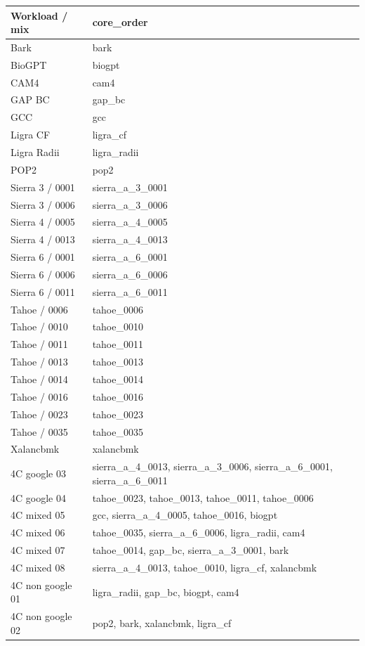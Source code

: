\begin{tabular}{ll}
\toprule
Workload / mix & core\_order \\
\midrule
Bark & bark \\
BioGPT & biogpt \\
CAM4 & cam4 \\
GAP BC & gap\_bc \\
GCC & gcc \\
Ligra CF & ligra\_cf \\
Ligra Radii & ligra\_radii \\
POP2 & pop2 \\
Sierra 3 / 0001 & sierra\_a\_3\_0001 \\
Sierra 3 / 0006 & sierra\_a\_3\_0006 \\
Sierra 4 / 0005 & sierra\_a\_4\_0005 \\
Sierra 4 / 0013 & sierra\_a\_4\_0013 \\
Sierra 6 / 0001 & sierra\_a\_6\_0001 \\
Sierra 6 / 0006 & sierra\_a\_6\_0006 \\
Sierra 6 / 0011 & sierra\_a\_6\_0011 \\
Tahoe / 0006 & tahoe\_0006 \\
Tahoe / 0010 & tahoe\_0010 \\
Tahoe / 0011 & tahoe\_0011 \\
Tahoe / 0013 & tahoe\_0013 \\
Tahoe / 0014 & tahoe\_0014 \\
Tahoe / 0016 & tahoe\_0016 \\
Tahoe / 0023 & tahoe\_0023 \\
Tahoe / 0035 & tahoe\_0035 \\
Xalancbmk & xalancbmk \\
4C google 03 & sierra\_a\_4\_0013, sierra\_a\_3\_0006, sierra\_a\_6\_0001, sierra\_a\_6\_0011 \\
4C google 04 & tahoe\_0023, tahoe\_0013, tahoe\_0011, tahoe\_0006 \\
4C mixed 05 & gcc, sierra\_a\_4\_0005, tahoe\_0016, biogpt \\
4C mixed 06 & tahoe\_0035, sierra\_a\_6\_0006, ligra\_radii, cam4 \\
4C mixed 07 & tahoe\_0014, gap\_bc, sierra\_a\_3\_0001, bark \\
4C mixed 08 & sierra\_a\_4\_0013, tahoe\_0010, ligra\_cf, xalancbmk \\
4C non google 01 & ligra\_radii, gap\_bc, biogpt, cam4 \\
4C non google 02 & pop2, bark, xalancbmk, ligra\_cf \\

\end{tabular}
